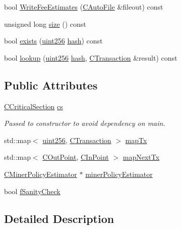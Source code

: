 \begin{DoxyCompactItemize}
\item 
bool \hyperlink{class_c_tx_mem_pool_a0a05d7b50b9c2a387182402e60475da6}{Write\+Fee\+Estimates} (\hyperlink{class_c_auto_file}{C\+Auto\+File} \&fileout) const 
\item 
unsigned long \hyperlink{class_c_tx_mem_pool_a0d3646e13e7fce3b1df3dd30b02e3396}{size} () const 
\item 
bool \hyperlink{class_c_tx_mem_pool_a93b2aa8c01fa291d183a82a9e0beeb35}{exists} (\hyperlink{classuint256}{uint256} \hyperlink{cache_8cc_a11ecb029164e055f28f4123ce3748862}{hash}) const 
\item 
bool \hyperlink{class_c_tx_mem_pool_a8c19232d17e668c6690721b0f5088960}{lookup} (\hyperlink{classuint256}{uint256} \hyperlink{cache_8cc_a11ecb029164e055f28f4123ce3748862}{hash}, \hyperlink{class_c_transaction}{C\+Transaction} \&result) const 
\end{DoxyCompactItemize}
\subsection*{Public Attributes}
\begin{DoxyCompactItemize}
\item 
\hyperlink{sync_8h_a37a4692b2d517f2843655ca11af7668a}{C\+Critical\+Section} \hyperlink{class_c_tx_mem_pool_ac7ee8c06837c7d2688e2d7e3d071bdbb}{cs}
\begin{DoxyCompactList}\small\item\em Passed to constructor to avoid dependency on main. \end{DoxyCompactList}\item 
std\+::map$<$ \hyperlink{classuint256}{uint256}, \hyperlink{class_c_transaction}{C\+Transaction} $>$ \hyperlink{class_c_tx_mem_pool_a340d4a897e521b7021e6b22cce951beb}{map\+Tx}
\item 
std\+::map$<$ \hyperlink{class_c_out_point}{C\+Out\+Point}, \hyperlink{class_c_in_point}{C\+In\+Point} $>$ \hyperlink{class_c_tx_mem_pool_aae6f1162f0b2e42b369971f32a9f71e8}{map\+Next\+Tx}
\item 
\hyperlink{class_c_miner_policy_estimator}{C\+Miner\+Policy\+Estimator} $\ast$ \hyperlink{class_c_tx_mem_pool_a435be1fdb4567cd7dd981a49cf633c99}{miner\+Policy\+Estimator}
\item 
bool \hyperlink{class_c_tx_mem_pool_a1752e79ce537972fe87e252b9d07d2e0}{f\+Sanity\+Check}
\end{DoxyCompactItemize}


\subsection{Detailed Description}


